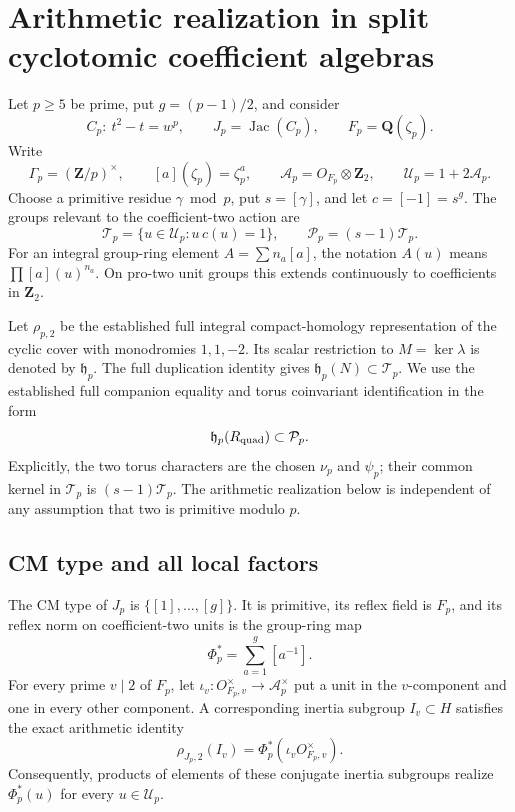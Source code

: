 \section{Arithmetic realization in split cyclotomic coefficient algebras}
\label{sec:prime-degree-local-cm}

Let \(p\ge5\) be prime, put \(g=(p-1)/2\), and consider
\[
 C_p:\ t^2-t=w^p,\qquad J_p=\operatorname{Jac}(C_p),
 \qquad F_p=\mathbf Q(\zeta_p).
\]
Write
\[
 \Gamma_p=(\mathbf Z/p)^\times,\qquad
 [a](\zeta_p)=\zeta_p^a,\qquad
 \mathcal A_p=O_{F_p}\otimes\mathbf Z_2,\qquad
 \mathcal U_p=1+2\mathcal A_p.
\]
Choose a primitive residue \(\gamma\bmod p\), put
\(s=[\gamma]\), and let \(c=[-1]=s^g\).
The groups relevant to the coefficient-two action are
\[
 \mathcal T_p=\{u\in\mathcal U_p:u\,c(u)=1\},
 \qquad \mathcal P_p=(s-1)\mathcal T_p.
\]
For an integral group-ring element \(A=\sum n_a[a]\),
the notation \(A(u)\) means \(\prod[a](u)^{n_a}\).
On pro-two unit groups this extends continuously to
coefficients in \(\mathbf Z_2\).

Let \(\rho_{p,2}\) be the established full integral
compact-homology representation of the cyclic cover with
monodromies \(1,1,-2\). Its scalar restriction to
\(M=\ker\lambda\) is denoted by \(\mathfrak h_p\).
The full duplication identity gives
\(\mathfrak h_p(N)\subset\mathcal T_p\).
We use the established full companion equality and
torus coinvariant identification in the form
\begin{equation}\label{eq:pdl-upper-input}
 \mathfrak h_p(R_{\rm quad})\subset\mathcal P_p.
\end{equation}
Explicitly, the two torus characters are the chosen
\(\nu_p\) and \(\psi_p\); their common kernel in
\(\mathcal T_p\) is \((s-1)\mathcal T_p\).
The arithmetic realization below is independent of
any assumption that two is primitive modulo \(p\).

\subsection{CM type and all local factors}

\begin{lemma}\label{lem:pdl-reflex-and-local}
The CM type of \(J_p\) is \(\{[1],\ldots,[g]\}\).
It is primitive, its reflex field is \(F_p\), and its
reflex norm on coefficient-two units is the group-ring map
\[
                           \Phi_p^*=\sum_{a=1}^{g}[a^{-1}].
\]
For every prime \(v\mid2\) of \(F_p\), let
\(\iota_v:O_{F_p,v}^\times\to\mathcal A_p^\times\)
put a unit in the \(v\)-component and one in every other
component. A corresponding inertia subgroup \(I_v\subset H\)
satisfies the exact arithmetic identity
\begin{equation}\label{eq:pdl-one-inertia}
                \rho_{J_p,2}(I_v)
                    =\Phi_p^*(\iota_v O_{F_p,v}^\times).
\end{equation}
Consequently, products of elements of these conjugate
inertia subgroups realize \(\Phi_p^*(u)\) for every
\(u\in\mathcal U_p\).
\end{lemma}

